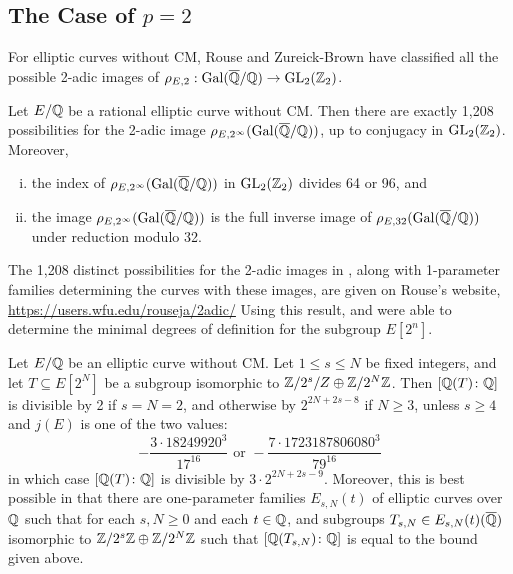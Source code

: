 \subsection{The Case of $p= 2$\label{sec:nonic2}}

For elliptic curves without CM, Rouse and Zureick-Brown have classified all the possible 2-adic images of $\rho_{E,2}: \operatorname{Gal}(\overline{\mathbb{Q}}/\mathbb{Q}) \to \operatorname{GL}_2(\mathbb{Z}_2)$.


\begin{thm}
Let $E/\mathbb{Q}$ be a rational elliptic curve without CM. Then there are exactly 1,208 possibilities for the 2-adic image $\rho_{E,2^\infty}(\operatorname{Gal}(\overline{\mathbb{Q}}/\mathbb{Q}))$, up to conjugacy in $\operatorname{GL}_2(\mathbb{Z}_2)$. Moreover,
	\begin{enumerate}[(i)]
	\item the index of $\rho_{E,2^\infty}(\operatorname{Gal}(\overline{\mathbb{Q}}/\mathbb{Q}))$ in $\operatorname{GL}_2(\mathbb{Z}_2)$ divides 64 or 96, and
	\item the image $\rho_{E,2^\infty}(\operatorname{Gal}(\overline{\mathbb{Q}}/\mathbb{Q}))$ is the full inverse image of $\rho_{E,32}(\operatorname{Gal}(\overline{\mathbb{Q}}/\mathbb{Q}))$ under reduction modulo 32. 
	\end{enumerate}
\end{thm}


The 1,208 distinct possibilities for the 2-adic images in \cite{rousezureickbrown15}, along with 1-parameter families determining the curves with these images, are given on Rouse's website, \url{https://users.wfu.edu/rouseja/2adic/} Using this result, \gonjim{} and \lozrob{} were able to determine the minimal degrees of definition for the subgroup $E[2^n]$. 


\begin{thm} \label{thm:2torsionbound}
Let $E/\mathbb{Q}$ be an elliptic curve without CM. Let $1 \leq s \leq N$ be fixed integers, and let $T \subseteq E[2^N]$ be a subgroup isomorphic to $\mathbb{Z}/2^s/Z \oplus \mathbb{Z}/2^N \mathbb{Z}$. Then $[\mathbb{Q}(T) \colon \mathbb{Q}]$ is divisible by 2 if $s=N=2$, and otherwise by $2^{2N+2s-8}$ if $N \geq 3$, unless $s \geq 4$ and $j(E)$ is one of the two values:
	\[
	- \dfrac{3 \cdot 18249920^3}{17^{16}} \text{ or } - \dfrac{7 \cdot 1723187806080^3}{79^{16}}
	\]
in which case $[\mathbb{Q}(T) \colon \mathbb{Q}]$ is divisible by $3 \cdot 2^{2N+2s-9}$. Moreover, this is best possible in that there are one-parameter families $E_{s,N}(t)$ of elliptic curves over $\mathbb{Q}$ such that for each $s, N \geq 0$ and each $t \in \mathbb{Q}$, and subgroups $T_{s,N} \in E_{s,N}(t)(\overline{\mathbb{Q}})$ isomorphic to $\mathbb{Z}/2^s\mathbb{Z} \oplus \mathbb{Z}/2^N\mathbb{Z}$ such that $[\mathbb{Q}(T_{s,N}) \colon \mathbb{Q}]$ is equal to the bound given above. 
\end{thm}


